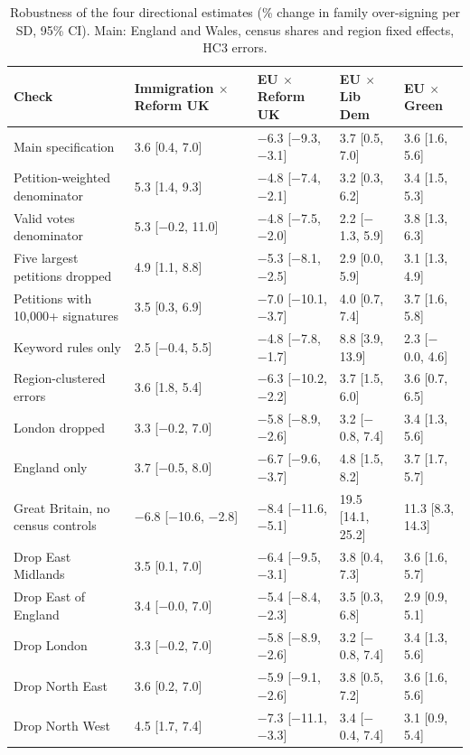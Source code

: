 \documentclass[11pt,a4paper]{article}
\begin{document}
\begin{table}[tbp]\centering\scriptsize\caption{Robustness of the four directional estimates (\% change in family over-signing per SD, 95\% CI). Main: England and Wales, census shares and region fixed effects, HC3 errors.}\label{tab:rob}\setlength{\tabcolsep}{3pt}\begin{tabular}{lllll}\toprule Check & Immigration $\times$ Reform UK & EU $\times$ Reform UK & EU $\times$ Lib Dem & EU $\times$ Green\\\midrule
Main specification & 3.6 [0.4, 7.0] & $-$6.3 [$-$9.3, $-$3.1] & 3.7 [0.5, 7.0] & 3.6 [1.6, 5.6]\\\midrule
Petition-weighted denominator & 5.3 [1.4, 9.3] & $-$4.8 [$-$7.4, $-$2.1] & 3.2 [0.3, 6.2] & 3.4 [1.5, 5.3]\\
Valid votes denominator & 5.3 [$-$0.2, 11.0] & $-$4.8 [$-$7.5, $-$2.0] & 2.2 [$-$1.3, 5.9] & 3.8 [1.3, 6.3]\\
Five largest petitions dropped & 4.9 [1.1, 8.8] & $-$5.3 [$-$8.1, $-$2.5] & 2.9 [0.0, 5.9] & 3.1 [1.3, 4.9]\\
Petitions with 10,000+ signatures & 3.5 [0.3, 6.9] & $-$7.0 [$-$10.1, $-$3.7] & 4.0 [0.7, 7.4] & 3.7 [1.6, 5.8]\\
Keyword rules only & 2.5 [$-$0.4, 5.5] & $-$4.8 [$-$7.8, $-$1.7] & 8.8 [3.9, 13.9] & 2.3 [$-$0.0, 4.6]\\
Region-clustered errors & 3.6 [1.8, 5.4] & $-$6.3 [$-$10.2, $-$2.2] & 3.7 [1.5, 6.0] & 3.6 [0.7, 6.5]\\
London dropped & 3.3 [$-$0.2, 7.0] & $-$5.8 [$-$8.9, $-$2.6] & 3.2 [$-$0.8, 7.4] & 3.4 [1.3, 5.6]\\
England only & 3.7 [$-$0.5, 8.0] & $-$6.7 [$-$9.6, $-$3.7] & 4.8 [1.5, 8.2] & 3.7 [1.7, 5.7]\\
Great Britain, no census controls & $-$6.8 [$-$10.6, $-$2.8] & $-$8.4 [$-$11.6, $-$5.1] & 19.5 [14.1, 25.2] & 11.3 [8.3, 14.3]\\
Drop East Midlands & 3.5 [0.1, 7.0] & $-$6.4 [$-$9.5, $-$3.1] & 3.8 [0.4, 7.3] & 3.6 [1.6, 5.7]\\
Drop East of England & 3.4 [$-$0.0, 7.0] & $-$5.4 [$-$8.4, $-$2.3] & 3.5 [0.3, 6.8] & 2.9 [0.9, 5.1]\\
Drop London & 3.3 [$-$0.2, 7.0] & $-$5.8 [$-$8.9, $-$2.6] & 3.2 [$-$0.8, 7.4] & 3.4 [1.3, 5.6]\\
Drop North East & 3.6 [0.2, 7.0] & $-$5.9 [$-$9.1, $-$2.6] & 3.8 [0.5, 7.2] & 3.6 [1.6, 5.6]\\
Drop North West & 4.5 [1.7, 7.4] & $-$7.3 [$-$11.1, $-$3.3] & 3.4 [$-$0.4, 7.4] & 3.1 [0.9, 5.4]\\

\end{tabular}
\end{table}
\end{document}
